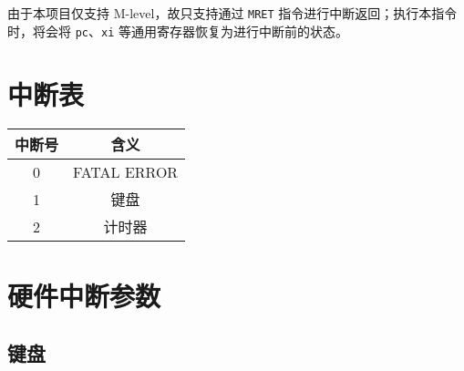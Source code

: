 由于本项目仅支持 M-level，故只支持通过 \texttt{MRET} 指令进行中断返回；执行本指令时，将会将 \texttt{pc}、\texttt{xi} 等通用寄存器恢复为进行中断前的状态。

\section{中断表}
\begin{tabular}{|c|c|}
    \hline
    中断号 & 含义\\\hline
    0     & FATAL ERROR\\\hline
    1     & 键盘\\\hline
    2     & 计时器\\\hline
\end{tabular}

\section{硬件中断参数}
\subsection{键盘}

